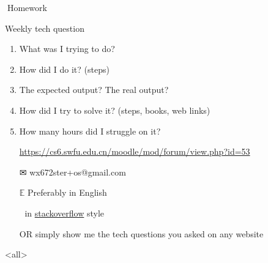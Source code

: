 \begin{frame}{{}Homework}
  \begin{block}{Weekly tech question}
    \begin{enumerate}
    \item What was I trying to do?
    \item How did I do it? (steps)
    \item The expected output? The real output?
    \item How did I try to solve it? (steps, books, web links)
    \item How many hours did I struggle on it?
    \end{enumerate}
  \end{block}
  \begin{itemize}
  \item[\moodle] \url{https://cs6.swfu.edu.cn/moodle/mod/forum/view.php?id=53}
  \item[\Large\dejavu ✉] \alert{\ttfamily wx672ster+os@gmail.com}%
  \item[$\mathbb{E}$] Preferably in English
  \item[] in
    \href{https://stackoverflow.com/questions/39199299/what-is-the-essential-difference-between-compound-command-and-normal-command-inlink}{stackoverflow}
    style
  \item[OR] simply show me the tech questions you asked on any website
  \end{itemize}  
\end{frame}

\mode<all>
